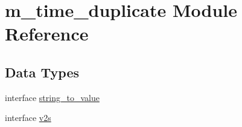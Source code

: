 \hypertarget{namespacem__time__duplicate}{}\section{m\+\_\+time\+\_\+duplicate Module Reference}
\label{namespacem__time__duplicate}
\subsection*{Data Types}
\begin{DoxyCompactItemize}
\item 
interface \mbox{\hyperlink{interfacem__time__duplicate_1_1string__to__value}{string\+\_\+to\+\_\+value}}
\item 
interface \mbox{\hyperlink{interfacem__time__duplicate_1_1v2s}{v2s}}
\end{DoxyCompactItemize}
